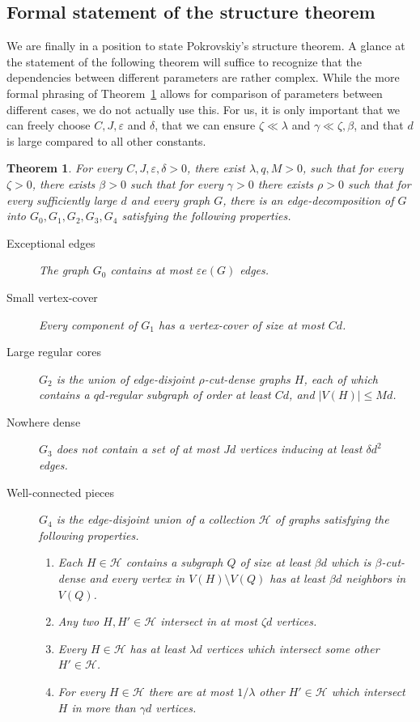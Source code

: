 \documentclass[10pt]{article}
\newtheorem{theorem}{Theorem}[section]
\theoremstyle{definition}
\newcommand\ab[1]{\lvert#1\rvert}
\let\leq\leqslant
\begin{document}
\subsection{Formal statement of the structure theorem}\label{sec:statement}

We are finally in a position to state Pokrovskiy's structure theorem. A glance at the statement of the following theorem will suffice to recognize that the dependencies between different parameters are rather complex. While the more formal phrasing of Theorem~\ref{thm: structure} allows for comparison of parameters between different cases, we do not actually use this. For us, it is only important that we can freely choose $C,J,\varepsilon$ and $\delta$, that we can ensure $\zeta\ll\lambda$ and $\gamma\ll\zeta,\beta$, and that $d$ is large compared to all other constants.
\begin{theorem}\label{thm: structure}
    For every $C,J,\varepsilon,{\delta}>0$, there exist $\lambda,q,M>0$, such that for every $\zeta>0$, there exists $\beta>0$ such that for every $\gamma>0$ there exists $\rho>0$ such that for every sufficiently large $d$ and every graph $G$, there is an edge-decomposition of $G$ into $G_0,G_1,G_2,G_3,G_4$ satisfying the following properties.
    \begin{description}
        \item[Exceptional edges] The graph $G_0$ contains at most $\varepsilon e(G)$ edges.
        \item[Small vertex-cover] Every component of $G_1$ has a vertex-cover of size at most $Cd$. 
        \item[Large regular cores] $G_2$ is the union of edge-disjoint $\rho$-cut-dense graphs $H$, each of which contains a $qd$-regular subgraph of order at least $Cd$, and $\ab{V(H)}\leq Md$.  
        \item[Nowhere dense] $G_3$ does not contain a set of at most $Jd$ vertices inducing at least ${\delta} d^2$ edges.
        \item[Well-connected pieces] $G_4$ is the edge-disjoint union of a collection $\mathcal H$ of graphs satisfying the following properties.
        \begin{enumerate}
            \item Each $H\in\mathcal H$ contains a subgraph $Q$ of size at least $\beta d$ which is $\beta$-cut-dense and every vertex in $V(H)\setminus V(Q)$ has at least $\beta d$ neighbors in $V(Q)$.
            \item Any two $H,H'\in\mathcal H$ intersect in at most $\zeta d$ vertices.
            \item Every $H\in \mathcal H$ has at least $\lambda d$ vertices which intersect some other $H'\in\mathcal H$.
            \item For every $H\in\mathcal H$ there are at most $1/\lambda$ other $H'\in\mathcal H$ which intersect $H$ in more than $\gamma d$ vertices.
        \end{enumerate}
    \end{description}
\end{theorem}
\end{document}
